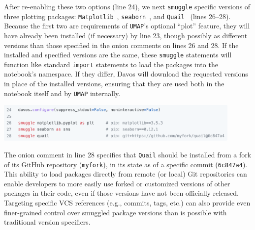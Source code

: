 \documentclass[preprint,12pt,a4paper]{elsarticle}
\begin{document}
After re-enabling these two options (line 24), we next \texttt{smuggle}
specific versions of three plotting packages:
\texttt{Matplotlib}~\cite{Hunt07}, \texttt{seaborn}~\cite{Wask21}, and
\texttt{Quail}~\cite{HeusEtal17} (lines 26--28). Because the first two
are requirements of \texttt{UMAP}'s optional ``plot'' feature, they
will have already been installed (if necessary) by line 23, though possibly as
different versions than those specified in the onion comments on lines
26 and 28. If the installed and specified versions are the same, these
\texttt{smuggle} statements will function like standard \texttt{import}
statements to load the packages into the notebook's namespace. If they
differ, Davos will download the requested versions in place
of the installed versions, ensuring that they are used both in the notebook itself and by \texttt{UMAP} internally.
\begin{center}
\includegraphics[width=0.9\textwidth]{figs/example6}
\end{center}
The onion comment in line 28 specifies that \texttt{Quail} should be
installed from a fork of its GitHub repository (\texttt{myfork}), in its state as of a specific commit (\texttt{6c847a4}).
This ability to load packages directly from remote (or local) Git repositories can
enable developers to more easily use forked or customized versions of other
packages in their code, even if those versions have not been
officially released. Targeting specific VCS references (e.g., commits, tags, etc.) can also provide even finer-grained control over smuggled package versions than is possible with traditional version specifiers.
\end{document}
